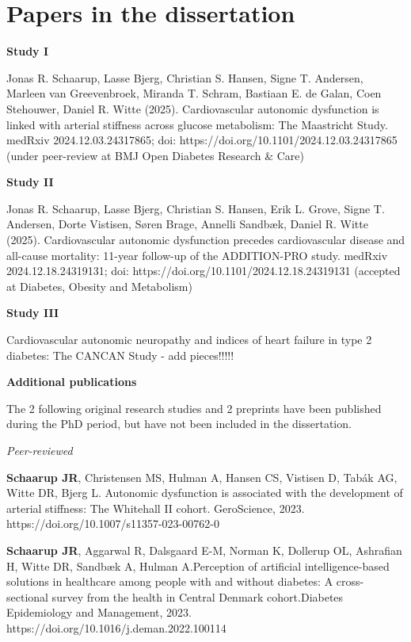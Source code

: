 \documentclass[
  a4paper,
  headsepline=true,
  open=any]{scrbook}
\begin{document}

\hypertarget{sec-linked-papers}{%
\chapter*{Papers in the dissertation}\label{sec-linked-papers}}


\textbf{Study I}

Jonas R. Schaarup, Lasse Bjerg, Christian S. Hansen, Signe T. Andersen,
Marleen van Greevenbroek, Miranda T. Schram, Bastiaan E. de Galan, Coen
Stehouwer, Daniel R. Witte (2025). Cardiovascular autonomic dysfunction
is linked with arterial stiffness across glucose metabolism: The
Maastricht Study. medRxiv 2024.12.03.24317865; doi:
https://doi.org/10.1101/2024.12.03.24317865 (under peer-review at BMJ
Open Diabetes Research \& Care)

\textbf{Study II}

Jonas R. Schaarup, Lasse Bjerg, Christian S. Hansen, Erik L. Grove,
Signe T. Andersen, Dorte Vistisen, Søren Brage, Annelli Sandbæk, Daniel
R. Witte (2025). Cardiovascular autonomic dysfunction precedes
cardiovascular disease and all-cause mortality: 11-year follow-up of the
ADDITION-PRO study. medRxiv 2024.12.18.24319131; doi:
https://doi.org/10.1101/2024.12.18.24319131 (accepted at Diabetes,
Obesity and Metabolism)

\textbf{Study III}

Cardiovascular autonomic neuropathy and indices of heart failure in type
2 diabetes: The CANCAN Study - add pieces!!!!!

\newpage

\textbf{Additional publications}

The 2 following original research studies and 2 preprints have been
published during the PhD period, but have not been included in the
dissertation.

\emph{Peer-reviewed}

\textbf{Schaarup JR}, Christensen MS, Hulman A, Hansen CS, Vistisen D,
Tabák AG, Witte DR, Bjerg L. Autonomic dysfunction is associated with
the development of arterial stiffness: The Whitehall II cohort.
GeroScience, 2023. https://doi.org/10.1007/s11357-023-00762-0

\textbf{Schaarup JR}, Aggarwal R, Dalsgaard E-M, Norman K, Dollerup OL,
Ashrafian H, Witte DR, Sandbæk A, Hulman A.Perception of artificial
intelligence-based solutions in healthcare among people with and without
diabetes: A cross-sectional survey from the health in Central Denmark
cohort.Diabetes Epidemiology and Management, 2023.
https://doi.org/10.1016/j.deman.2022.100114
\end{document}
